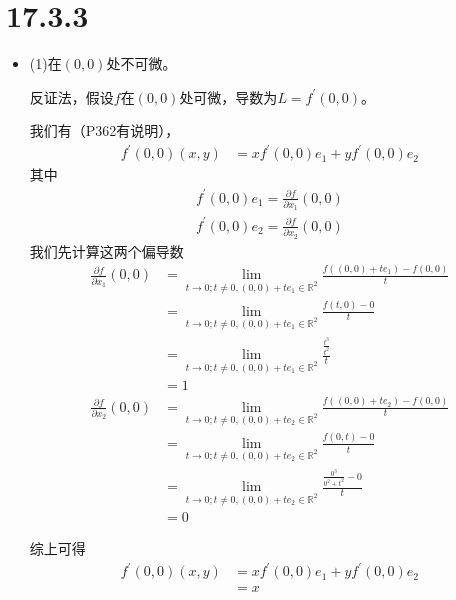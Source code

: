 \documentclass{article}
\begin{document}
\section*{17.3.3}
\begin{itemize}
  \item (1)在$(0, 0)$处不可微。

        反证法，假设$f$在$(0, 0)$处可微，导数为$L = f^\prime(0, 0)$。

        我们有（P362有说明），
        \begin{align*}
          f^\prime(0, 0)(x, y)
           & = xf^\prime(0, 0)e_1 + yf^\prime(0, 0)e_2
        \end{align*}
        其中
        \begin{align*}
          f^\prime(0, 0)e_1 = \frac{\partial f}{\partial x_1}(0, 0) \\
          f^\prime(0, 0)e_2 = \frac{\partial f}{\partial x_2}(0, 0)
        \end{align*}
        我们先计算这两个偏导数
        \begin{align*}
          \frac{\partial f}{\partial x_1}(0, 0)
           & = \lim\limits_{t \to 0; t \neq 0, (0, 0) + te_1 \in \mathbb{R}^2} \frac{f((0, 0) + te_1) - f(0, 0)}{t} \\
           & = \lim\limits_{t \to 0; t \neq 0, (0, 0) + te_1 \in \mathbb{R}^2} \frac{f(t, 0) - 0}{t}                \\
           & = \lim\limits_{t \to 0; t \neq 0, (0, 0) + te_1 \in \mathbb{R}^2} \frac{\frac{t^3}{t^2}}{t}            \\
           & = 1
        \end{align*}
        \begin{align*}
          \frac{\partial f}{\partial x_2}(0, 0)
           & = \lim\limits_{t \to 0; t \neq 0, (0, 0) + te_2 \in \mathbb{R}^2} \frac{f((0, 0) + te_2) - f(0, 0)}{t} \\
           & = \lim\limits_{t \to 0; t \neq 0, (0, 0) + te_2 \in \mathbb{R}^2} \frac{f(0, t) - 0}{t}                \\
           & = \lim\limits_{t \to 0; t \neq 0, (0, 0) + te_2 \in \mathbb{R}^2} \frac{\frac{0^3}{0^2 + t^2} - 0}{t}  \\
           & = 0
        \end{align*}

        综上可得
        \begin{align*}
          f^\prime(0, 0)(x, y)
           & = xf^\prime(0, 0)e_1 + yf^\prime(0, 0)e_2 \\
           & = x
        \end{align*}


\end{itemize}
\end{document}
